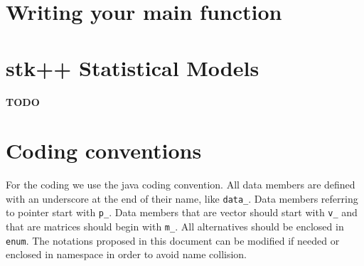 \documentclass[a4paper,11pt]{article}
\begin{document}
\section{Writing your main function}

\section{stk++ Statistical Models}

{\bf TODO}

\appendix

\section{Coding conventions}

For the coding we use the java coding convention. All data members
are defined with an underscore at the end of their name, like \verb+data_+.
Data members referring to pointer start with \verb+p_+.
Data members that are vector should start with \verb+v_+ and that are matrices should begin with \verb+m_+.
All alternatives should be enclosed in \verb+enum+.
The notations proposed in this document can be modified if needed
or enclosed in namespace in order to avoid name collision.


% 
% 
% 
% 
% 
\end{document}
